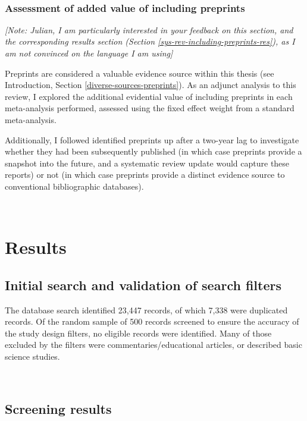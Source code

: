 \documentclass[a4paper, twoside]{templates/ociamthesis}
\begin{document}
~

\hypertarget{assessment-of-added-value-of-including-preprints}{%
\subsubsection{Assessment of added value of including preprints}\label{assessment-of-added-value-of-including-preprints}}

\emph{{[}Note: Julian, I am particularly interested in your feedback on this section, and the corresponding results section (Section \ref{sys-rev-including-preprints-res}), as I am not convinced on the language I am using{]}}

Preprints are considered a valuable evidence source within this thesis (see Introduction, Section \ref{diverse-sources-preprints}). As an adjunct analysis to this review, I explored the additional evidential value of including preprints in each meta-analysis performed, assessed using the fixed effect weight from a standard meta-analysis.

Additionally, I followed identified preprints up after a two-year lag to investigate whether they had been subsequently published (in which case preprints provide a snapshot into the future, and a systematic review update would capture these reports) or not (in which case preprints provide a distinct evidence source to conventional bibliographic databases).

~

\hypertarget{results}{%
\section{Results}\label{results}}

\hypertarget{initial-search-and-validation-of-search-filters}{%
\subsection{Initial search and validation of search filters}\label{initial-search-and-validation-of-search-filters}}

The database search identified 23,447 records, of which 7,338 were duplicated records. Of the random sample of 500 records screened to ensure the accuracy of the study design filters, no eligible records were identified. Many of those excluded by the filters were commentaries/educational articles, or described basic science studies.

~

\hypertarget{screening-results}{%
\subsection{Screening results}\label{screening-results}}
\end{document}
